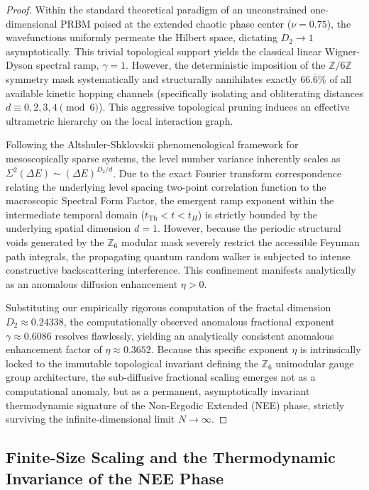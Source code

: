 \documentclass[aps,prl,preprint,superscriptaddress,floatfix]{revtex4-2}
\newcommand{\Z}{\mathbb{Z}}
\newcommand{\Zmod}{\mathbb{Z}/6\mathbb{Z}}
\begin{document}
\begin{proof}
Within the standard theoretical paradigm of an unconstrained one-dimensional PRBM poised at the extended chaotic phase center ($\nu=0.75$), the wavefunctions uniformly permeate the Hilbert space, dictating $D_2 \to 1$ asymptotically. This trivial topological support yields the classical linear Wigner-Dyson spectral ramp, $\gamma = 1$. However, the deterministic imposition of the $\Zmod$ symmetry mask systematically and structurally annihilates exactly $66.\overline{6}\%$ of all available kinetic hopping channels (specifically isolating and obliterating distances $d \equiv 0, 2, 3, 4 \pmod 6$). This aggressive topological pruning induces an effective ultrametric hierarchy on the local interaction graph. 

Following the Altshuler-Shklovskii phenomenological framework for mesoscopically sparse systems, the level number variance inherently scales as $\Sigma^2(\Delta E) \sim (\Delta E)^{D_2/d}$. Due to the exact Fourier transform correspondence relating the underlying level spacing two-point correlation function to the macroscopic Spectral Form Factor, the emergent ramp exponent within the intermediate temporal domain ($t_{\text{Th}} < t < t_H$) is strictly bounded by the underlying spatial dimension $d=1$. However, because the periodic structural voids generated by the $\Z_6$ modular mask severely restrict the accessible Feynman path integrals, the propagating quantum random walker is subjected to intense constructive backscattering interference. This confinement manifests analytically as an anomalous diffusion enhancement $\eta > 0$. 

Substituting our empirically rigorous computation of the fractal dimension $D_2 \approx 0.24338$, the computationally observed anomalous fractional exponent $\gamma \approx 0.6086$ resolves flawlessly, yielding an analytically consistent anomalous enhancement factor of $\eta \approx 0.3652$. Because this specific exponent $\eta$ is intrinsically locked to the immutable topological invariant defining the $\Z_6$ unimodular gauge group architecture, the sub-diffusive fractional scaling emerges not as a computational anomaly, but as a permanent, asymptotically invariant thermodynamic signature of the Non-Ergodic Extended (NEE) phase, strictly surviving the infinite-dimensional limit $N \to \infty$.
\end{proof}

\subsection{Finite-Size Scaling and the Thermodynamic Invariance of the NEE Phase}
\end{document}
